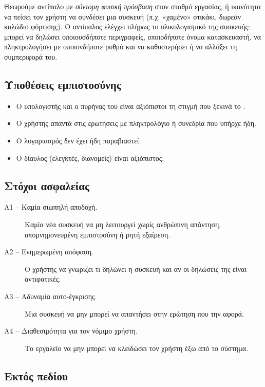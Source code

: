 Θεωρούμε αντίπαλο με \emph{σύντομη φυσική πρόσβαση} στον σταθμό εργασίας, ή
ικανότητα να πείσει τον χρήστη να συνδέσει μια συσκευή (π.χ. «χαμένο» στικάκι,
δωρεάν καλώδιο φόρτισης). Ο αντίπαλος ελέγχει πλήρως το υλικολογισμικό της
συσκευής: μπορεί να δηλώσει οποιουσδήποτε περιγραφείς, οποιοδήποτε όνομα
κατασκευαστή, να πληκτρολογήσει με οποιονδήποτε ρυθμό και να καθυστερήσει ή να
αλλάξει τη συμπεριφορά του.

\subsection{Υποθέσεις εμπιστοσύνης}

\begin{itemize}
  \item Ο υπολογιστής και ο πυρήνας του είναι αξιόπιστοι τη στιγμή που ξεκινά το
        \Probolos.
  \item Ο χρήστης απαντά στις ερωτήσεις με πληκτρολόγιο ή συνεδρία  που
        υπήρχε ήδη.
  \item Ο λογαριασμός  δεν έχει ήδη παραβιαστεί.
  \item Ο δίαυλος (ελεγκτές, διανομείς) είναι αξιόπιστος.
\end{itemize}

\subsection{Στόχοι ασφαλείας}

\begin{description}
  \item[Α1 -- Καμία σιωπηλή αποδοχή.] Καμία νέα συσκευή να μη λειτουργεί χωρίς
        ανθρώπινη απάντηση, απομνημονευμένη εμπιστοσύνη ή ρητή εξαίρεση.
  \item[Α2 -- Ενημερωμένη απόφαση.] Ο χρήστης να γνωρίζει τι δηλώνει η συσκευή
        και αν οι δηλώσεις της είναι αντιφατικές.
  \item[Α3 -- Αδυναμία αυτο-έγκρισης.] Μια συσκευή να μην μπορεί να απαντήσει
        στην ερώτηση που την αφορά.
  \item[Α4 -- Διαθεσιμότητα για τον νόμιμο χρήστη.] Το εργαλείο να μην μπορεί να
        κλειδώσει τον χρήστη έξω από το σύστημα.
\end{description}

\subsection{Εκτός πεδίου}

